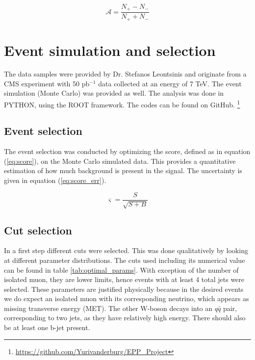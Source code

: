 \documentclass[%
 reprint,
 amsmath,amssymb,
 aps,
]{revtex4-2}
\begin{document}
\begin{equation}\label{eq:charge_asym}
    \mathcal{A} = \frac{N_+ - N_-}{N_+ + N_-}
\end{equation}


\section{\label{sec:}Event simulation and selection}
The data samples were provided by Dr. Stefanos Leontsinis and originate from a CMS experiment with 50 pb$^{-1}$ data collected at an energy of 7 TeV. The event simulation (Monte Carlo) was provided as well. 
The analysis was done in \textsc{PYTHON}, using the \textsc{ROOT} framework. The codes can be found on GitHub. \footnote{\url{https://github.com/Yurivanderburg/EPP_Project}} 


\subsection{\label{sec:}Event selection}
The event selection was conducted by optimizing the score, defined as in equation (\ref{eq:score}), on the Monte Carlo simulated data. This provides a quantitative estimation of how much background is present in the signal. The uncertainty is given in equation (\ref{eq:score_err}).

\begin{equation}\label{eq:score}
    \varsigma = \frac{S}{\sqrt{S + B}}
\end{equation}


\subsection{Cut selection}
In a first step different cuts were selected. This was done qualitatively by looking at different parameter distributions. The cuts used including its numerical value can be found in table \ref{tab:optimal_params}. With exception of the number of isolated muon, they are lower limits, hence events with at least 4 total jets were selected. 
These parameters are justified physically because in the desired events we do expect an isolated muon with its corresponding neutrino, which appears as missing transverse energy (MET). The other W-boson decays into an $q \bar q$ pair, corresponding to two jets, as they have relatively high energy. There should also be at least one b-jet present.  
\end{document}
